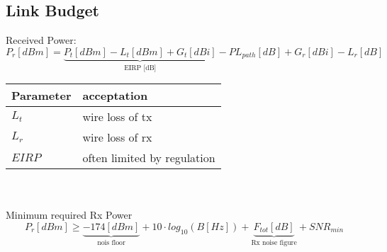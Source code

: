 \subsection{Link Budget}
Received Power:
\begin{equation*}
	P_r [dBm] = \underbrace{P_t [dBm] - L_t [dBm] + G_t[dBi]}_{\text{EIRP [dB]}} - PL_{path}[dB] + G_r[dBi] -L_r[dB]
\end{equation*}

\begin{tabular}{ll}
\textbf{Parameter} & \textbf{acceptation} \\ \hline
$L_t$ & wire loss of tx \\ 
$L_r$ & wire loss of rx \\ 
$EIRP$ & often limited by regulation \\ 
\end{tabular} \\ \\

Minimum required Rx Power
\begin{equation*}
	P_r [dBm] \geq \underbrace{-174[dBm]}_{\text{nois floor}} + 10 \cdot log_{10}(B [Hz]) + \underbrace{F_{tot}[dB]}_{\text{Rx noise figure}} + SNR_{min}
\end{equation*}